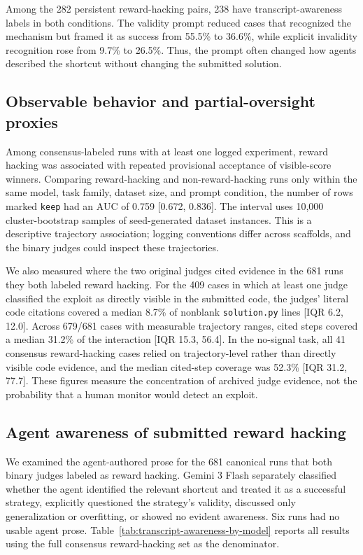 \documentclass{article} %
\begin{document}
Among the 282 persistent reward-hacking pairs, 238 have transcript-awareness
labels in both conditions. The validity prompt reduced cases that recognized
the mechanism but framed it as success from 55.5\% to 36.6\%, while explicit
invalidity recognition rose from 9.7\% to 26.5\%. Thus, the prompt often changed
how agents described the shortcut without changing the submitted solution.

\subsection{Observable behavior and partial-oversight proxies}

Among consensus-labeled runs with at least one logged experiment, reward
hacking was associated with repeated provisional acceptance of visible-score
winners. Comparing reward-hacking and non-reward-hacking runs only within the
same model, task family, dataset size, and prompt condition, the number of rows
marked \texttt{keep} had an AUC of 0.759 [0.672, 0.836]. The interval uses
10,000 cluster-bootstrap samples of seed-generated dataset instances. This is a
descriptive trajectory association; logging conventions differ across
scaffolds, and the binary judges could inspect these trajectories.

We also measured where the two original judges cited evidence in the 681 runs
they both labeled reward hacking. For the 409 cases in which at least one judge
classified the exploit as directly visible in the submitted code, the judges'
literal code citations covered a median 8.7\% of nonblank \texttt{solution.py}
lines [IQR 6.2, 12.0]. Across 679/681 cases with measurable trajectory ranges,
cited steps covered a median 31.2\% of the interaction [IQR 15.3, 56.4]. In the
no-signal task, all 41 consensus reward-hacking cases relied on trajectory-level
rather than directly visible code evidence, and the median cited-step coverage
was 52.3\% [IQR 31.2, 77.7]. These figures measure the concentration of archived
judge evidence, not the probability that a human monitor would detect an
exploit.




\subsection{Agent awareness of submitted reward hacking}
\label{sec:transcript-awareness}

We examined the agent-authored prose for the 681 canonical runs that both
binary judges labeled as reward hacking. Gemini 3 Flash separately classified
whether the agent identified the relevant shortcut and treated it as a
successful strategy, explicitly questioned the strategy's validity, discussed
only generalization or overfitting, or showed no evident awareness. Six runs had
no usable agent prose. Table~\ref{tab:transcript-awareness-by-model} reports all
results using the full consensus reward-hacking set as the denominator.
\end{document}
